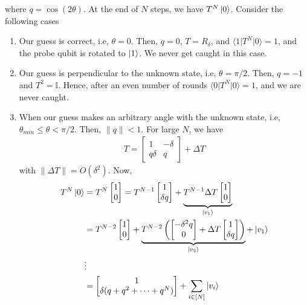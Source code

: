 \documentclass[]{article}
\newcommand*{\I}{\mathbb I}
\newcommand{\Exp}[3]{\langle #1 \vert #2 \vert #3 \rangle}
\begin{document}
where $q = \cos (2\theta)$. At the end of $N$ steps, we have $T^N\ket{0}$. Consider the following cases
\begin{enumerate}
    \item Our guess is correct, i.e, $\theta = 0$. Then, $q = 0$, $T = R_\delta$, and $\Exp{1}{T^N}{0} = 1$, and the probe qubit is rotated to $\ket{1}$. We never get caught in this case.
    \item Our guess is perpendicular to the unknown state, i.e, $\theta = \pi/2$. Then, $q = -1$ and $T^2 = \I$. Hence, after an even number of rounds $\Exp{0}{T^N}{0} = 1$, and we are never caught.
    \item When our guess makes an arbitrary angle with the unknown state, i.e, $\theta_{min} \leq \theta < \pi/2$. Then, $\| q\| < 1$. For large $N$, we have 
    \begin{align}
        T = \begin{bmatrix}
            1 & - \delta \\
            q \delta & q 
        \end{bmatrix} + \Delta T
    \end{align}
    with $\|\Delta T \| = O(\delta^2)$. Now,
    \begin{align*}
        T^N \ket{0} &= T^N \begin{bmatrix}
            1 \\ 0
        \end{bmatrix} = T^{N - 1}\begin{bmatrix}
            1 \\ \delta q
        \end{bmatrix} + \underbrace{T^{N - 1} \Delta T \begin{bmatrix}
            1 \\ 0
        \end{bmatrix}}_{\ket{v_1}} \\
        &= T^{N - 2}\begin{bmatrix}
            1 \\ 0
        \end{bmatrix} + \underbrace{T^{N - 2}\left(\begin{bmatrix}
            -\delta^2 q \\ 0
        \end{bmatrix} + \Delta T \begin{bmatrix}
            1 \\ \delta q
        \end{bmatrix}\right)}_{\ket{v_2}} + \ket{v_1} \\
        &\vdots \\
        &= \begin{bmatrix}
            1 \\ \delta (q + q^2 + \cdots + q^N)  
        \end{bmatrix} + \sum_{i \in [N]} \ket{v_i}
    \end{align*}


\end{enumerate}
\end{document}

